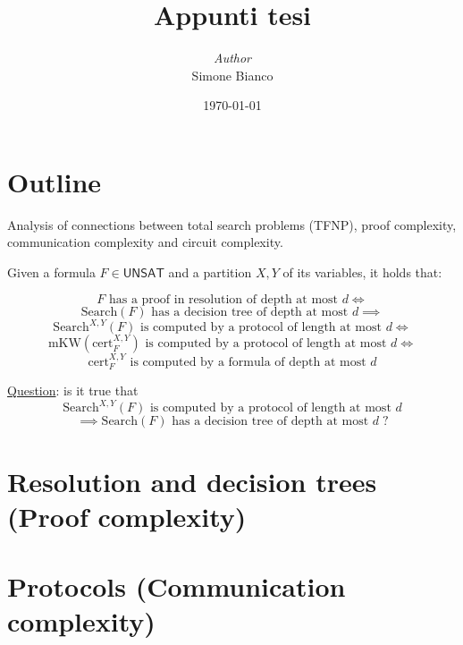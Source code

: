 \documentclass[a4paper, 12pt]{report}
\institute{\curlyquotes{\hspace{0.25mm}Sapienza} Università di Roma}
\title{Appunti tesi}
\subtitle{}
\author{\textit{Author}\\Simone Bianco}
\date{\today}
\begin{document}
    \maketitle

    {
        \hypersetup{allcolors=black}

        \romantableofcontents
    }


    \chapter{Outline}

    Analysis of connections between total search problems (\textsf{TFNP}), proof complexity, communication complexity and circuit complexity.

    Given a formula $F \in \mathsf{UNSAT}$ and a partition $X,Y$ of its variables, it holds that:

    \[F \text{ has a proof in resolution of depth at most } d \iff \]
    \[\mathrm{Search}(F) \text{ has a decision tree of depth at most } d \implies \]
    \[\mathrm{Search}^{X,Y}(F) \text{ is computed by a protocol of length at most } d \iff \]
    \[\mathrm{mKW}(\mathrm{cert}^{X,Y}_F) \text{ is computed by a protocol of length at most } d \iff \]
    \[\mathrm{cert}^{X,Y}_F \text{ is computed by a formula of depth at most } d \]


    \quad

    \underline{Question}: is it true that 
    \[\mathrm{Search}^{X,Y}(F) \text{ is computed by a protocol of length at most } d \]
    \[\implies \mathrm{Search}(F) \text{ has a decision tree of depth at most } d \; ?\]

    \chapter{Resolution and decision trees (Proof complexity)}

    \chapter{Protocols (Communication complexity)}
\end{document}

